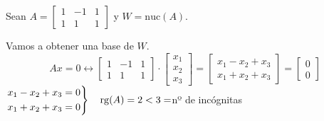 
Sean $A=\begin{bmatrix}
	1 & -1 & 1\\
	1 & 1 & 1
\end{bmatrix}$ y $W=\mathrm{nuc}(A)$.

Vamos a obtener una base de $W$.\[ Ax=0\longleftrightarrow\begin{bmatrix}
	1 & -1 & 1\\
	1 & 1 & 1
\end{bmatrix}\cdot\begin{bmatrix}
x_1\\
x_2\\
x_3
\end{bmatrix}=\begin{bmatrix}
x_1-x_2+x_3\\
x_1+x_2+x_3
\end{bmatrix}=\begin{bmatrix}
0\\
0
\end{bmatrix} \]$\begin{rcases}
x_1-x_2+x_3=0\\
x_1+x_2+x_3=0
\end{rcases}\quad\mathrm{rg}(A)=2<3=$nº de incógnitas

